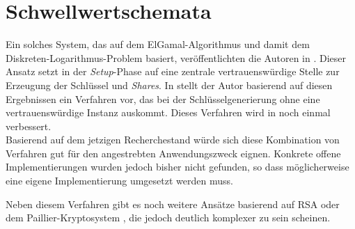 \section{Schwellwertschemata}

\label{sec_state_threshold}

Ein solches System, das auf dem ElGamal-Algorithmus und damit dem Diskreten-Logarithmus-Problem basiert, veröffentlichten die Autoren in \cite{DesmedtFrankel1990}.  Dieser Ansatz setzt in der \textit{Setup}-Phase auf eine zentrale vertrauenswürdige Stelle zur Erzeugung der Schlüssel und \textit{Shares}. In \cite{pedersen1991} stellt der Autor basierend auf diesen Ergebnissen ein Verfahren vor, das bei der Schlüsselgenerierung ohne eine vertrauenswürdige Instanz auskommt. Dieses Verfahren wird in \cite{gennaro1999} noch einmal verbessert.\\
Basierend auf dem jetzigen Recherchestand würde sich diese Kombination von Verfahren gut für den angestrebten Anwendungszweck eignen. Konkrete offene Implementierungen wurden jedoch bisher nicht gefunden, so dass möglicherweise eine eigene Implementierung umgesetzt werden muss.

Neben diesem Verfahren gibt es noch weitere Ansätze basierend auf RSA \cite{desmedt1993, nguyen2005} oder dem Paillier-Kryptosystem \cite{paillier1999, damgard2001}, die jedoch deutlich komplexer zu sein scheinen. 


